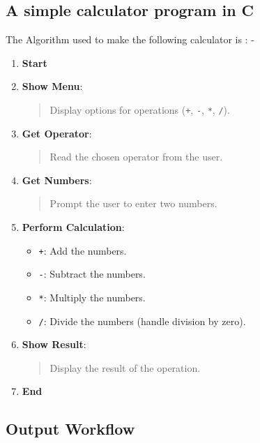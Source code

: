 \documentclass[a4paper,12pt]{article}
\begin{document}
\subsection{A simple calculator program in C}
The Algorithm used to make the following calculator is : -
\begin{enumerate}
    \item \textbf{Start}
    \item \textbf{Show Menu}:
    \begin{quote}
        Display options for operations (\texttt{+}, \texttt{-}, \texttt{*}, \texttt{/}).
    \end{quote}
    \item \textbf{Get Operator}:
    \begin{quote}
        Read the chosen operator from the user.
    \end{quote}
    \item \textbf{Get Numbers}:
    \begin{quote}
        Prompt the user to enter two numbers.
    \end{quote}
    \item \textbf{Perform Calculation}:
    \begin{itemize}
        \item \texttt{+}: Add the numbers.
        \item \texttt{-}: Subtract the numbers.
        \item \texttt{*}: Multiply the numbers.
        \item \texttt{/}: Divide the numbers (handle division by zero).
    \end{itemize}
    \item \textbf{Show Result}:
    \begin{quote}
        Display the result of the operation.
    \end{quote}
    \item \textbf{End}
\end{enumerate}

\subsection{Output Workflow}
\end{document}
